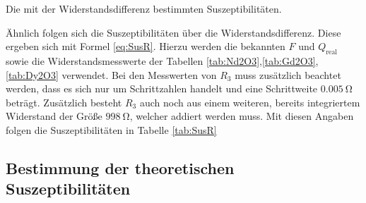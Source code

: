 \begin{table}
 \centering
 \caption{Die mit der Widerstandsdifferenz bestimmten Suszeptibilitäten.}
 
 \label{tab:SusR}
\end{table}


Ähnlich folgen sich die Suszeptibilitäten über die Widerstandsdifferenz. Diese ergeben sich mit Formel
\ref{eq:SusR}. Hierzu werden die bekannten $F$ und $Q_\text{real}$ sowie die Widerstandsmesswerte
der Tabellen \ref{tab:Nd2O3},\ref{tab:Gd2O3},\ref{tab:Dy2O3} verwendet.
Bei den Messwerten von $R_3$ muss zusätzlich beachtet werden, dass es sich nur
um Schrittzahlen handelt und eine Schrittweite $\SI{0.005}{\ohm}$ beträgt.
Zusätzlich besteht $R_3$ auch noch aus einem weiteren, bereits integriertem Widerstand
der Größe $\SI{998}{\ohm}$, welcher addiert werden muss. Mit diesen Angaben folgen die Suszeptibilitäten in Tabelle \ref{tab:SusR}

\subsection{Bestimmung der theoretischen Suszeptibilitäten}
